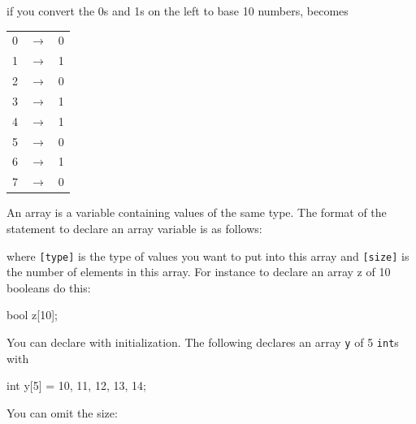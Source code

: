 if you convert the 0s and 1s on the left to base 10 numbers, becomes

\begin{center}
\begin{tabular}{rcl}
0 & $\rightarrow$ & 0 \\
1 & $\rightarrow$ & 1 \\
2 & $\rightarrow$ & 0 \\
3 & $\rightarrow$ & 1 \\
4 & $\rightarrow$ & 1 \\
5 & $\rightarrow$ & 0 \\
6 & $\rightarrow$ & 1 \\
7 & $\rightarrow$ & 0 \\
\end{tabular}
\end{center}

\newpage{}







\newpage{}

An array is a variable containing values of the same type. The format of the statement to declare an array variable is as follows:

\begin{center}
\end{center}

where \texttt{[type]} is the type of values you want to put into this array and \texttt{[size]} is the number of elements in this array. For instance to declare an array z of 10 booleans do this:

\begin{consolethree}[escapeinside=||]
bool z[10];
\end{consolethree}

You can declare with initialization. The following declares an array \texttt{y} of 5 \texttt{int}s with

\begin{consolethree}[escapeinside=||]
int y[5] = {10, 11, 12, 13, 14};
\end{consolethree}

You can omit the size:

